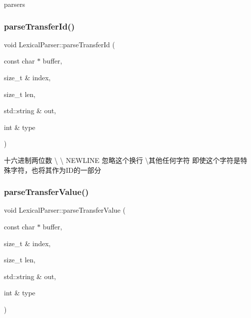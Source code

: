 parsers \mbox{\label{class_lexical_parser_a6df790a89ab25c5d64cf28c6ac22d011}} 
\subsubsection{\texorpdfstring{parse\+Transfer\+Id()}{parseTransferId()}}
{\footnotesize\ttfamily void Lexical\+Parser\+::parse\+Transfer\+Id (\begin{DoxyParamCaption}\item[{const char $\ast$}]{buffer,  }\item[{size\+\_\+t \&}]{index,  }\item[{size\+\_\+t}]{len,  }\item[{std\+::string \&}]{out,  }\item[{int \&}]{type }\end{DoxyParamCaption})\hspace{0.3cm}{\ttfamily [delete]}}

十六进制两位数 \textbackslash{} \textbackslash{} N\+E\+W\+L\+I\+NE 忽略这个换行 \textbackslash{}其他任何字符 即使这个字符是特殊字符，也将其作为\+I\+D的一部分 \mbox{\label{class_lexical_parser_a958596ee7745fcd38d83ee81b1f96234}} 
\subsubsection{\texorpdfstring{parse\+Transfer\+Value()}{parseTransferValue()}}
{\footnotesize\ttfamily void Lexical\+Parser\+::parse\+Transfer\+Value (\begin{DoxyParamCaption}\item[{const char $\ast$}]{buffer,  }\item[{size\+\_\+t \&}]{index,  }\item[{size\+\_\+t}]{len,  }\item[{std\+::string \&}]{out,  }\item[{int \&}]{type }\end{DoxyParamCaption})\hspace{0.3cm}{\ttfamily [delete]}}

